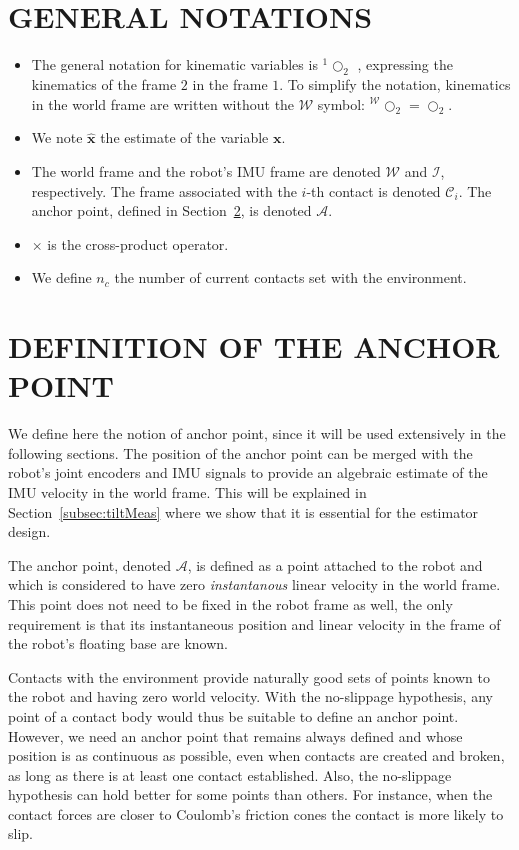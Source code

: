 \documentclass{IJCAS}
\begin{document}
\section{GENERAL NOTATIONS}
\begin{itemize}
    \item The general notation for kinematic variables is $^{1}\bigcirc_{2}$ , expressing the kinematics of the frame $2$ in the frame $1$. To simplify the notation, kinematics in the world frame are written without the $\mathcal{W}$ symbol: $^{\mathcal{W}}\bigcirc_{2}=\bigcirc_{2}$.
    \item We note $\hat{\boldsymbol{x}}$ the estimate of the variable $\boldsymbol{x}$.
    \item The world frame and the robot's IMU frame are denoted $\mathcal{W}$ and $\mathcal{I}$, respectively. The frame associated with the $i$-th contact is denoted $\mathcal{C}_{i}$. The anchor point, defined in Section~\ref{sec:anchor_point}, is denoted $\mathcal{A}$. 
    \item $\times$ is the cross-product operator. 
    \item We define $n_c$ the number of current contacts set with the environment.
    
\end{itemize} 



\section{DEFINITION OF THE ANCHOR POINT}\label{sec:anchor_point}
We define here the notion of anchor point, since it will be used extensively in the following sections. The position of the anchor point can be merged with the robot's joint encoders and IMU signals to provide an algebraic estimate of the IMU velocity in the world frame. This will be explained in Section~\ref{subsec:tiltMeas} where we show that it is essential for the estimator design.

The anchor point, denoted $\mathcal{A}$, is defined as a point attached to the robot and which is considered to have zero \emph{instantanous} linear velocity in the world frame. This point does not need to be fixed in the robot frame as well, the only requirement is that its instantaneous position and linear velocity in the frame of the robot's floating base are known. 

Contacts with the environment provide naturally good sets of points known to the robot and having zero world velocity. With the no-slippage hypothesis, any point of a contact body would thus be suitable to define an anchor point. However, we need an anchor point that remains always defined and whose position is as continuous as possible, even when contacts are created and broken, as long as there is at least one contact established. Also, the no-slippage hypothesis can hold better for some points than others. For instance, when the contact forces are closer to Coulomb's friction cones the contact is more likely to slip.
\end{document}
